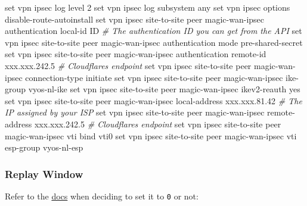 \documentclass[
]{article}
\newenvironment{Shaded}{\begin{snugshade}}{\end{snugshade}}
\newcommand{\BuiltInTok}[1]{#1}
\newcommand{\CommentTok}[1]{\textcolor[rgb]{0.56,0.35,0.01}{\textit{#1}}}
\newcommand{\NormalTok}[1]{#1}
\newcommand{\StringTok}[1]{\textcolor[rgb]{0.31,0.60,0.02}{#1}}
\begin{document}
\begin{Shaded}
\begin{Highlighting}[numbers=left,,]
\BuiltInTok{set}\NormalTok{ vpn ipsec log level }\StringTok{\textquotesingle{}2\textquotesingle{}}
\BuiltInTok{set}\NormalTok{ vpn ipsec log subsystem }\StringTok{\textquotesingle{}any\textquotesingle{}}
\BuiltInTok{set}\NormalTok{ vpn ipsec options disable{-}route{-}autoinstall}
\BuiltInTok{set}\NormalTok{ vpn ipsec site{-}to{-}site peer magic{-}wan{-}ipsec authentication local{-}id }\StringTok{\textquotesingle{}ID\textquotesingle{}} \CommentTok{\# The authentication ID you can get from the API}
\BuiltInTok{set}\NormalTok{ vpn ipsec site{-}to{-}site peer magic{-}wan{-}ipsec authentication mode }\StringTok{\textquotesingle{}pre{-}shared{-}secret\textquotesingle{}}
\BuiltInTok{set}\NormalTok{ vpn ipsec site{-}to{-}site peer magic{-}wan{-}ipsec authentication remote{-}id }\StringTok{\textquotesingle{}xxx.xxx.242.5\textquotesingle{}} \CommentTok{\# Cloudflare\textquotesingle{}s endpoint}
\BuiltInTok{set}\NormalTok{ vpn ipsec site{-}to{-}site peer magic{-}wan{-}ipsec connection{-}type }\StringTok{\textquotesingle{}initiate\textquotesingle{}}
\BuiltInTok{set}\NormalTok{ vpn ipsec site{-}to{-}site peer magic{-}wan{-}ipsec ike{-}group }\StringTok{\textquotesingle{}vyos{-}nl{-}ike\textquotesingle{}}
\BuiltInTok{set}\NormalTok{ vpn ipsec site{-}to{-}site peer magic{-}wan{-}ipsec ikev2{-}reauth }\StringTok{\textquotesingle{}yes\textquotesingle{}}
\BuiltInTok{set}\NormalTok{ vpn ipsec site{-}to{-}site peer magic{-}wan{-}ipsec local{-}address }\StringTok{\textquotesingle{}xxx.xxx.81.42\textquotesingle{}} \CommentTok{\# The IP assigned by your ISP}
\BuiltInTok{set}\NormalTok{ vpn ipsec site{-}to{-}site peer magic{-}wan{-}ipsec remote{-}address }\StringTok{\textquotesingle{}xxx.xxx.242.5\textquotesingle{}} \CommentTok{\# Cloudflare\textquotesingle{}s endpoint}
\BuiltInTok{set}\NormalTok{ vpn ipsec site{-}to{-}site peer magic{-}wan{-}ipsec vti bind }\StringTok{\textquotesingle{}vti0\textquotesingle{}}
\BuiltInTok{set}\NormalTok{ vpn ipsec site{-}to{-}site peer magic{-}wan{-}ipsec vti esp{-}group }\StringTok{\textquotesingle{}vyos{-}nl{-}esp\textquotesingle{}}
\end{Highlighting}
\end{Shaded}

\subsubsection{Replay Window}\label{replay-window}

Refer to the
\href{https://developers.cloudflare.com/magic-wan/reference/anti-replay-protection/\#1-and-anti-replay-protection}{docs}
when deciding to set it to \texttt{0} or not:
\end{document}
